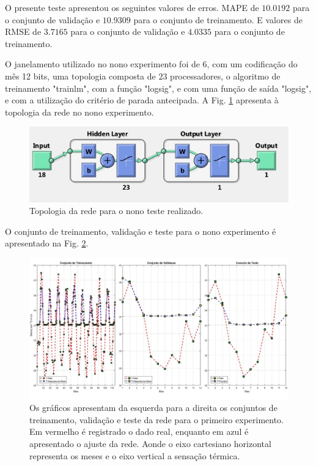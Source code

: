 \documentclass[journal, a4paper]{IEEEtran}
\begin{document}
O presente teste apresentou os seguintes valores de erros. MAPE de $10.0192$ para o conjunto de validação e $10.9309$ para o conjunto de treinamento. E valores de RMSE de $3.7165$ para o conjunto de validação e $4.0335$ para o conjunto de treinamento.

O janelamento utilizado no nono experimento foi de 6, com um codificação do mês 12 bits, uma topologia composta de $23$ processadores, o algoritmo de treinamento "trainlm", com a função "logsig", e com uma função de saída "logsig", e com a utilização do critério de parada antecipada. A Fig. \ref{topo9} apresenta à topologia da rede no nono experimento. 

\begin{figure}[H]
	\centering
	\includegraphics[scale=0.5]{Images/topologia9.jpg}
	\caption{Topologia da rede para o nono teste realizado.}
	\label{topo9}
\end{figure} 


O conjunto de treinamento, validação e teste para o nono experimento é apresentado na Fig. \ref{teste9}.

\begin{figure}[H]
	\centering
	\includegraphics[scale=0.15]{Images/Teste9.jpg}
	\caption{Os gráficos apresentam da esquerda para a direita os conjuntos de treinamento, validação e teste da rede para o primeiro experimento. Em vermelho é registrado o dado real, enquanto em azul é apresentado o ajuste da rede. Aonde o eixo cartesiano horizontal representa os meses e o eixo vertical a sensação térmica.}
	\label{teste9}
\end{figure} 
\end{document}
